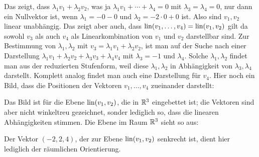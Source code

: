 \begin{bsp}
	Das zeigt, dass $\lambda_1 v_1 + \lambda_2 v_2$, was ja $\lambda_1 v_1 + \cdots + \lambda_4 =0$ mit $\lambda_3=\lambda_4 =0$, nur dann ein Nullvektor ist, wenn $\lambda_1 = - 0 - 0$ und $\lambda_2 = -2 \cdot 0 + 0$ ist. Also sind $v_1, v_2$ linear unabhängig. Das zeigt aber auch, dass $\operatorname{lin}(v_1,\ldots,v_4) = \operatorname{lin}(v_1, v_2)$ gilt da sowohl $v_3$ als auch $v_4$ als Linearkombination von $v_1$ und $v_2$ darstellbar sind. Zur Bestimmung von $\lambda_1, \lambda_2$ mit $v_3 = \lambda_1 v_1 + \lambda_2 v_2$, ist man auf der Suche nach einer Darstellung $\lambda_1 v_1  + \lambda_2 v_2 + \lambda_3 v_3 + \lambda_4 v_4$ mit $\lambda_3 = -1$ und $\lambda_4$. Solche $\lambda_1,\lambda_2$ findet man aus der reduzierten Stufenform, weil diese $\lambda_1,\lambda_2$ in Abhängigkeit von $\lambda_3, \lambda_4$ darstellt. Komplett analog findet man auch eine Darstellung für $v_4.$ Hier noch ein Bild, dass die Positionen der Vektoren $v_1,\ldots, v_4$ zueinander darstellt: 
	\begin{center} 
	\end{center} 
	Das Bild ist für die Ebene $\operatorname{lin}(v_1,v_2)$, die in $\mathbb R^3$ eingebettet ist; die Vektoren sind aber nicht winkeltreu gezeichnet, sonder lediglich so, dass die linearen Abhängigkeiten stimmen. Die Ebene im Raum $\mathbb R^3$ sieht so aus: 
	\begin{center} 
	\end{center} 
	Der Vektor $(-2,2,4)$, der zur Ebene $\operatorname{lin}(v_1,v_2)$ senkrecht ist, dient hier lediglich der räumlichen Orientierung. 
\end{bsp} 

